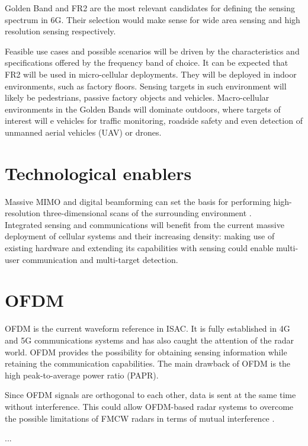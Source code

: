 Golden Band and FR2 are the most relevant candidates for defining the sensing spectrum in 6G. Their selection would make sense for wide area sensing and high resolution sensing respectively.

Feasible use cases and possible scenarios will be driven by the characteristics and specifications offered by the frequency band of choice. It can be expected that FR2 will be used in micro-cellular deployments. They will be deployed in indoor environments, such as factory floors. Sensing targets in such environment will likely be pedestrians, passive factory objects and vehicles.
Macro-cellular environments in the Golden Bands will dominate outdoors, where targets of interest will e vehicles for traffic monitoring, roadside safety and even detection of unmanned aerial vehicles (UAV) or drones.

\section{Technological enablers}


Massive MIMO and digital beamforming can set the basis for performing high-resolution three-dimensional scans of the surrounding environment \cite{MIMO-next-gen}. \\
Integrated sensing and communications will benefit from the current massive deployment of cellular systems and their increasing density: making use of existing hardware and extending its capabilities with sensing could enable multi-user communication and multi-target detection.

\section{OFDM}

OFDM is the current waveform reference in ISAC. It is fully established in 4G and 5G communications systems and has also caught the attention of the radar world. OFDM provides the possibility for obtaining sensing information while retaining the communication capabilities. The main drawback of OFDM is the high peak-to-average power ratio (PAPR).

Since OFDM signals are orthogonal to each other, data is sent at the same time without interference. This could allow OFDM-based radar systems to overcome the possible limitations of FMCW radars in terms of mutual interference \cite{Goppelt_Blöcher_Menzel_2010}.
%

...


